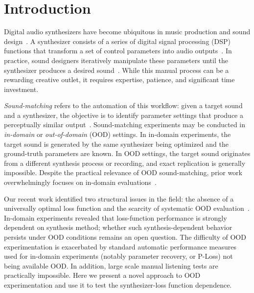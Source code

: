 \documentclass[10pt]{article} %
\begin{document}
\section{Introduction}


Digital audio synthesizers have become ubiquitous in music production and sound design~\cite{steinberg1996vst}. A synthesizer consists of a series of digital signal processing (DSP) functions that transform a set of control parameters into audio outputs~\cite{stranneby2004digital}. In practice, sound designers iteratively manipulate these parameters until the synthesizer produces a desired sound~\cite{krekovic2019insights}. While this manual process can be a rewarding creative outlet, it requires expertise, patience, and significant time investment.

\textit{Sound-matching} refers to the automation of this workflow: given a target sound and a synthesizer, the objective is to identify parameter settings that produce a perceptually similar output~\cite{justice1979analytic,horner1993machine,mitchell2007evolutionary}. Sound-matching experiments may be conducted in \textit{in-domain} or \textit{out-of-domain} (OOD) settings. In in-domain experiments, the target sound is generated by the same synthesizer being optimized and the ground-truth parameters are known. In OOD settings, the target sound originates from a different synthesis process or recording, and exact replication is generally impossible. Despite the practical relevance of OOD sound-matching, prior work overwhelmingly focuses on in-domain evaluations~\cite{horner1993machine,yee2018automatic,han2023perceptual,vahidi2023mesostructures,salimi2025evaluating}.

Our recent work identified two structural issues in the field: the absence of a universally optimal loss function and the scarcity of systematic OOD evaluation~\cite{salimi2025evaluating}. In-domain experiments revealed that loss-function performance is strongly dependent on synthesis method; whether such synthesis-dependent behavior persists under OOD conditions remains an open question. The difficulty of OOD experimentation is exacerbated by standard automatic performance measures used for in-domain experiments (notably parameter recovery, or P-Loss) not being available OOD. In addition, large scale manual listening tests are practically impossible. Here we present a novel approach to OOD experimentation and use it to test the synthesizer-loss function dependence.
\end{document}
